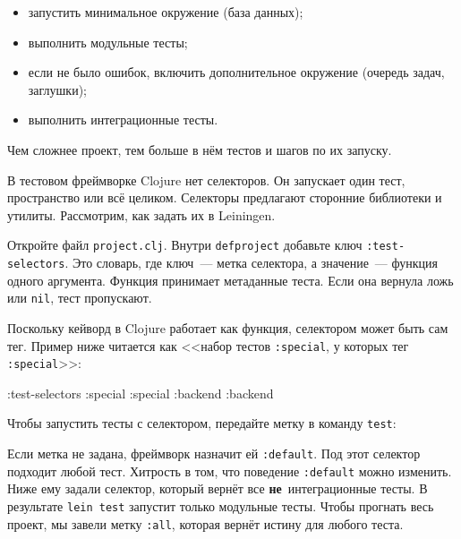 \begin{itemize}

\item
  запустить минимальное окружение (база данных);

\item
  выполнить модульные тесты;

\item
  если не было ошибок, включить дополнительное окружение (очередь задач,
  заглушки);

\item
  выполнить интеграционные тесты.

\end{itemize}

\noindent
Чем сложнее проект, тем больше в нём тестов и шагов по их запуску.

В тестовом фреймворке Clojure нет селекторов. Он запускает один тест,
пространство или всё целиком. Селекторы предлагают сторонние библиотеки и
утилиты. Рассмотрим, как задать их в Leiningen.

Откройте файл \verb|project.clj|. Внутри \texttt{def\-pro\-ject} добавьте ключ
\verb|:test-selectors|. Это словарь, где ключ~--- метка селектора, а
значение~--- функция одного аргумента. Функция принимает метаданные теста. Если
она вернула ложь или \verb|nil|, тест пропускают.

Поскольку кейворд в Clojure работает как функция, селектором может быть сам
тег. Пример ниже читается как <<набор тестов \verb|:special|, у которых тег
\verb|:special|>>:

\begin{english}
  \begin{clojure}
:test-selectors {:special :special
                 :backend :backend}
  \end{clojure}
\end{english}

\noindent
Чтобы запустить тесты с селектором, передайте метку в команду \verb|test|:

\begin{english}
\end{english}


Если метка не задана, фреймворк назначит ей \verb|:default|. Под этот селектор
подходит любой тест. Хитрость в том, что поведение \verb|:default| можно
изменить. Ниже ему задали селектор, который вернёт все
\textbf{не}~интеграционные тесты. В результате \verb|lein test| запустит только
модульные тесты. Чтобы прогнать весь проект, мы завели метку \verb|:all|,
которая вернёт истину для любого теста.

